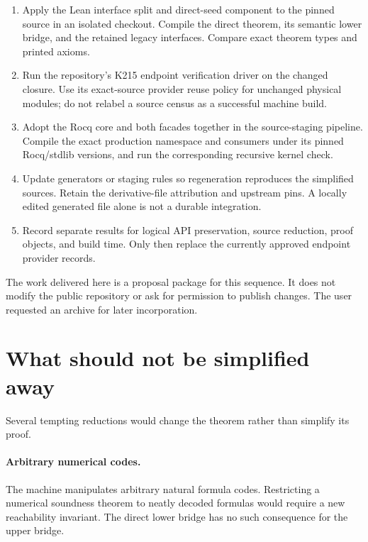 \documentclass[11pt,letterpaper]{article}
\theoremstyle{definition}
\theoremstyle{remark}
\begin{document}
\begin{enumerate}
\item Apply the Lean interface split and direct-seed component to the pinned
      source in an isolated checkout. Compile the direct theorem, its semantic
      lower bridge, and the retained legacy interfaces. Compare exact theorem
      types and printed axioms.
\item Run the repository's K215 endpoint verification driver on the changed
      closure. Use its exact-source provider reuse policy for unchanged physical
      modules; do not relabel a source census as a successful machine build.
\item Adopt the Rocq core and both facades together in the source-staging
      pipeline. Compile the exact production namespace and consumers under its
      pinned Rocq/stdlib versions, and run the corresponding recursive kernel
      check.
\item Update generators or staging rules so regeneration reproduces the
      simplified sources. Retain the derivative-file attribution and upstream
      pins. A locally edited generated file alone is not a durable integration.
\item Record separate results for logical API preservation, source reduction,
      proof objects, and build time. Only then replace the currently approved
      endpoint provider records.
\end{enumerate}

The work delivered here is a proposal package for this sequence. It does not
modify the public repository or ask for permission to publish changes. The
user requested an archive for later incorporation.

\section{What should not be simplified away}

Several tempting reductions would change the theorem rather than simplify its
proof.

\paragraph{Arbitrary numerical codes.}
The machine manipulates arbitrary natural formula codes. Restricting a numerical
soundness theorem to neatly decoded formulas would require a new reachability
invariant. The direct lower bridge has no such consequence for the upper bridge.
\end{document}
